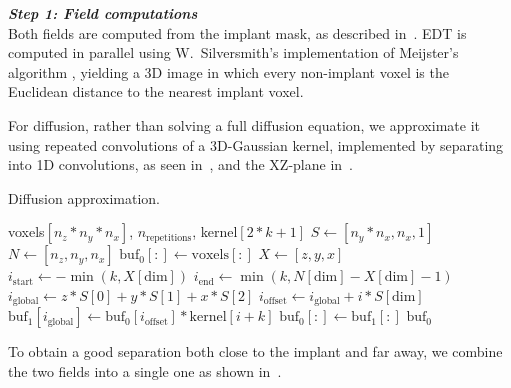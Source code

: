 \vspace{\baselineskip}
\noindent\textit{\textbf{Step 1: Field computations}}\\
Both fields are computed from the implant mask, as described
in~. EDT is computed in parallel using W.~Silversmith's
implementation of Meijster's algorithm \cite{pypi-edt}, yielding a 3D image in
which every non-implant voxel is the Euclidean distance to the nearest implant
voxel.

For diffusion, rather than solving a full diffusion equation, we approximate it
using repeated convolutions of a 3D-Gaussian kernel, implemented by separating
into 1D convolutions, as seen in~, and the XZ-plane
in~.

\begin{algorithm}
    \caption{Diffusion approximation.}
    \label{alg:diffusion}
    \begin{algorithmic}
         {voxels$[n_z*n_y*n_x]$, $n_\text{repetitions}$, \newline \indent \indent kernel$[2*k+1]$}
            \State $S \gets [n_y * n_x, n_x, 1]$
            \State $N \gets [n_z, n_y, n_x]$
            \State $\text{buf}_0[:] \gets \text{voxels}[:]$
                        \State $X \gets [z,y,x]$
                        \State $i_\text{start} \gets - \min (k, X[\text{dim}])$
                        \State $i_\text{end} \gets \min (k, N[\text{dim}] - X[\text{dim}] - 1)$
                        \State $i_\text{global} \gets z*S[0] + y*S[1] + x*S[2]$
                            \State $i_\text{offset} \gets i_\text{global} + i*S[\text{dim}]$
                            \State $\text{buf}_1[i_\text{global}] \gets \text{buf}_0[i_\text{offset}] * \text{kernel}[i+k]$
                        \EndFor
                    \EndFor
                    \State $\text{buf}_0[:] \gets \text{buf}_1[:]$
                \EndFor
            \EndFor
            \State \Return $\text{buf}_0$
        \EndFunction
    \end{algorithmic}
\end{algorithm}

To obtain a good separation both close to the implant and far away, we combine
the two fields into a single one as shown in~.

